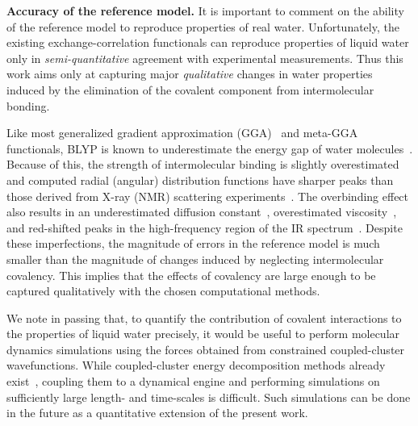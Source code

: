 \documentclass[journal=jacsat,manuscript=article]{achemso}
\begin{document}
\textbf{Accuracy of the reference model.} It is important to comment on the ability of the reference model to reproduce properties of real water. 
Unfortunately, the existing exchange-correlation functionals can reproduce properties of liquid water only in \emph{semi-quantitative} agreement with experimental measurements. 
Thus this work aims only at capturing major \emph{qualitative} changes in water properties induced by the elimination of the covalent component from intermolecular bonding. 

Like most generalized gradient approximation (GGA)~\cite{cheng2012alignment} and meta-GGA~\cite{chen2017ab} functionals, BLYP is known to underestimate the energy gap of water molecules~\cite{adriaanse2012aqueous}.
Because of this, the strength of intermolecular binding is slightly overestimated and computed radial (angular) distribution functions have sharper peaks than those derived from X-ray (NMR) scattering experiments~\cite{gillan2016perspective, ma2012ab}.
The overbinding effect also results in an underestimated diffusion constant~\cite{bankura2014structure}, overestimated viscosity~\cite{khaliullin2013microscopic}, and red-shifted peaks in the high-frequency region of the IR spectrum~\cite{lee2007dynamical}. 
Despite these imperfections, the magnitude of errors in the reference model is much smaller than the magnitude of changes induced by neglecting intermolecular covalency. 
This implies that the effects of covalency are large enough to be captured qualitatively with the chosen computational methods.

We note in passing that, to quantify the contribution of covalent interactions to the properties of liquid water precisely, it would be useful to perform molecular dynamics simulations using the forces obtained from constrained coupled-cluster wavefunctions. While coupled-cluster energy decomposition methods already exist~\cite{schneider2016decomposition,azar2012energy,azar2015similarity}, coupling them to a dynamical engine and performing simulations on sufficiently large length- and time-scales is difficult. Such simulations can be done in the future as a quantitative extension of the present work.
\end{document}
